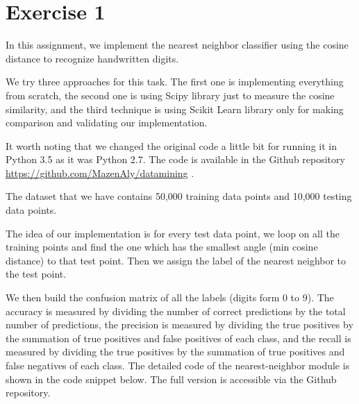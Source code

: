 \section*{Exercise 1}
In this assignment, we implement the nearest neighbor classifier using the cosine distance to recognize handwritten digits. 

We try three approaches for this task. The first one is implementing everything from scratch, the second one is using Scipy library just to measure the cosine similarity, and the third technique is using Scikit Learn library only for making comparison and validating our implementation.

It worth noting that we changed the original code a little bit for running it in Python 3.5 as it was Python 2.7. The code is available in the Github repository \url{https://github.com/MazenAly/datamining} .

The dataset that we have contains 50,000 training data points and 10,000 testing data points.

The idea of our implementation is for every 
test data point, we loop on all the training points and find the one which has the smallest angle (min cosine distance) to that test point. Then we assign the label of the nearest neighbor to the test point.

We then build the confusion matrix of all the labels (digits form 0 to 9). The accuracy is measured by dividing the number of correct predictions by the total number of predictions, the precision is measured by dividing the true positives by the summation of true positives and false positives of each class, and the recall is measured by dividing the true positives by the summation of true positives and false negatives of each class. The detailed code of the nearest-neighbor module is shown in the code snippet below. The full version is accessible via the Github repository.


